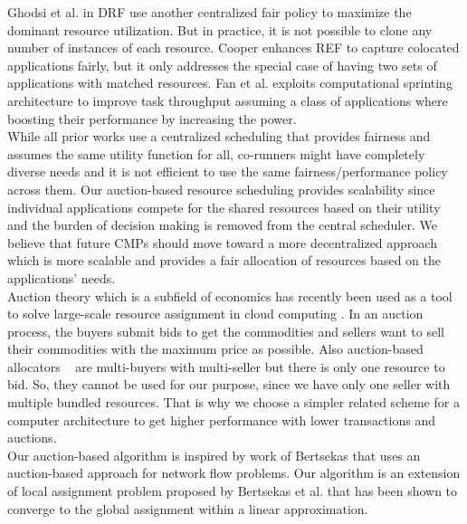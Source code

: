 \indent Ghodsi et al. in DRF \cite{ghodsi2011dominant} use another centralized fair policy to maximize the dominant resource utilization. But in practice, it is not possible to clone any number of instances of each resource. %
Cooper \cite{llull2017cooper} enhances REF to capture colocated applications fairly, but it only addresses the special case of having two sets of applications with matched resources. Fan et al. \cite{fan2016computational} exploits computational sprinting architecture to improve task throughput assuming a class of applications where boosting their performance by increasing the power. \\
\indent While all prior works use a centralized scheduling that provides fairness and assumes the same utility function for all, co-runners might have completely diverse needs and it is not efficient to use the same fairness/performance policy across them. 
Our auction-based resource scheduling provides scalability since individual applications compete for the shared resources based on their utility and the burden of decision making is removed from the central scheduler. We believe that future CMPs should move toward a more decentralized approach which is more scalable and provides a fair allocation of resources based on the applications' needs. \\ 
\indent Auction theory which is a subfield of economics has recently been used as a tool to solve large-scale resource assignment in cloud computing \cite{krishna2009auction, parsons2011auctions}. In an auction process, the buyers submit bids to get the commodities and sellers want to sell their commodities with the maximum price as possible. Also auction-based allocators ~\cite{Zhang2017DAB,8004498} are multi-buyers with multi-seller but there is only one resource to bid. So, they cannot be used for our purpose, since we have only one seller with multiple bundled resources. That is why we choose a simpler related scheme for a computer architecture to get higher performance with lower transactions and auctions. \\
\indent Our auction-based algorithm is inspired by work of Bertsekas \cite{bertsekas1998network} that uses an auction-based approach for network flow problems. Our algorithm is an extension of local assignment problem proposed by Bertsekas et al. that has been shown to converge to the global assignment within a linear approximation.
